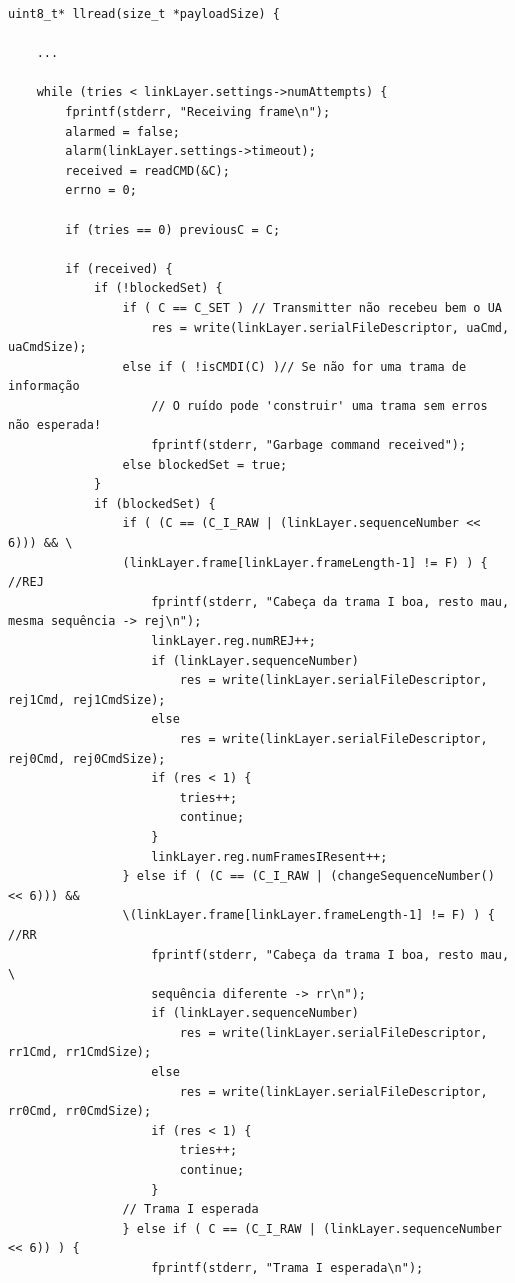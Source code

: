 \documentclass[a4paper]{article}
\begin{document}
\begin{verbatim}
uint8_t* llread(size_t *payloadSize) {

    ...

    while (tries < linkLayer.settings->numAttempts) {
        fprintf(stderr, "Receiving frame\n");
        alarmed = false;
        alarm(linkLayer.settings->timeout);
        received = readCMD(&C);
        errno = 0;

        if (tries == 0) previousC = C;

        if (received) {
            if (!blockedSet) {
                if ( C == C_SET ) // Transmitter não recebeu bem o UA
                    res = write(linkLayer.serialFileDescriptor, uaCmd, uaCmdSize);
                else if ( !isCMDI(C) )// Se não for uma trama de informação
                    // O ruído pode 'construir' uma trama sem erros não esperada!
                    fprintf(stderr, "Garbage command received");
                else blockedSet = true;
            }
            if (blockedSet) {
                if ( (C == (C_I_RAW | (linkLayer.sequenceNumber << 6))) && \
                (linkLayer.frame[linkLayer.frameLength-1] != F) ) { //REJ
                    fprintf(stderr, "Cabeça da trama I boa, resto mau, mesma sequência -> rej\n");
                    linkLayer.reg.numREJ++;
                    if (linkLayer.sequenceNumber)
                        res = write(linkLayer.serialFileDescriptor, rej1Cmd, rej1CmdSize);
                    else
                        res = write(linkLayer.serialFileDescriptor, rej0Cmd, rej0CmdSize);
                    if (res < 1) {
                        tries++;
                        continue;
                    }
                    linkLayer.reg.numFramesIResent++;
                } else if ( (C == (C_I_RAW | (changeSequenceNumber() << 6))) &&
                \(linkLayer.frame[linkLayer.frameLength-1] != F) ) { //RR
                    fprintf(stderr, "Cabeça da trama I boa, resto mau, \
                    sequência diferente -> rr\n");
                    if (linkLayer.sequenceNumber)
                        res = write(linkLayer.serialFileDescriptor, rr1Cmd, rr1CmdSize);
                    else
                        res = write(linkLayer.serialFileDescriptor, rr0Cmd, rr0CmdSize);
                    if (res < 1) {
                        tries++;
                        continue;
                    }
                // Trama I esperada
                } else if ( C == (C_I_RAW | (linkLayer.sequenceNumber << 6)) ) {
                    fprintf(stderr, "Trama I esperada\n");

\end{verbatim}
\end{document}

